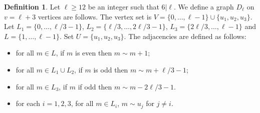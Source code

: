 \documentclass{article}
\theoremstyle{definition}
\newtheorem{defn}[thm]{Definition}
\begin{document}
\begin{defn} \label{Construction Dl}
    Let $\ell\ge 12$ be an integer such that $6|\ell$. We define a graph $D_\ell$ on $v=\ell+3$ vertices are follows. The vertex set is $V=\{0,\ldots,\ell-1\}\cup\{u_1,u_2,u_3\}$. Let $L_1=\{0,\ldots,\ell/3-1\}$, $L_2=\{\ell/3,\ldots,2\ell/3-1\}$, $L_3=\{2\ell/3,\ldots,\ell-1\}$ and $L=\{1,\ldots,\ell-1\}$. Set $U=\{u_1,u_2,u_3\}$. The adjacencies are defined as follows:
    \begin{itemize}
        \item for all $m\in L$, if $m$ is even then $m\sim m+1$;
        \item for all $m\in L_1\cup L_2$, if $m$ is odd then $m\sim m+\ell/3-1$;
        \item for all $m\in L_3$, if $m$ if odd then $m\sim m-2\ell/3-1$.
        \item for each $i=1,2,3$, for all $m\in L_i$, $m\sim u_j$ for $j\ne i$.
    \end{itemize}
\end{defn}
\end{document}
